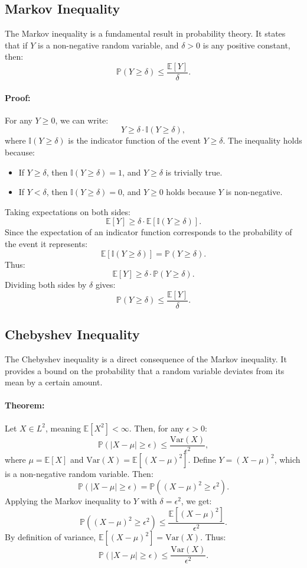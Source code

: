 \subsection{Markov Inequality}
The Markov inequality is a fundamental result in probability theory. It states that if \( Y \) is a non-negative random variable, and \( \delta > 0 \) is any positive constant, then:
\[
\mathbb{P}(Y \geq \delta) \leq \frac{\mathbb{E}[Y]}{\delta}.
\]

\paragraph{Proof:}  
For any \( Y \geq 0 \), we can write:
\[
Y \geq \delta \cdot \mathbb{I}(Y \geq \delta),
\]
where \( \mathbb{I}(Y \geq \delta) \) is the indicator function of the event \( Y \geq \delta \). The inequality holds because:
\begin{itemize}
    \item If \( Y \geq \delta \), then \( \mathbb{I}(Y \geq \delta) = 1 \), and \( Y \geq \delta \) is trivially true.
    \item If \( Y < \delta \), then \( \mathbb{I}(Y \geq \delta) = 0 \), and \( Y \geq 0 \) holds because \( Y \) is non-negative.
\end{itemize}
Taking expectations on both sides:
\[
\mathbb{E}[Y] \geq \delta \cdot \mathbb{E}[\mathbb{I}(Y \geq \delta)].
\]
Since the expectation of an indicator function corresponds to the probability of the event it represents:
\[
\mathbb{E}[\mathbb{I}(Y \geq \delta)] = \mathbb{P}(Y \geq \delta).
\]
Thus:
\[
\mathbb{E}[Y] \geq \delta \cdot \mathbb{P}(Y \geq \delta).
\]
Dividing both sides by \( \delta \) gives:
\[
\mathbb{P}(Y \geq \delta) \leq \frac{\mathbb{E}[Y]}{\delta}.
\]

\subsection{Chebyshev Inequality}
The Chebyshev inequality is a direct consequence of the Markov inequality. It provides a bound on the probability that a random variable deviates from its mean by a certain amount.

\paragraph{Theorem:}
Let \( X \in L^2 \), meaning \( \mathbb{E}[X^2] < \infty \). Then, for any \( \epsilon > 0 \):
\[
\mathbb{P}(|X - \mu| \geq \epsilon) \leq \frac{\mathrm{Var}(X)}{\epsilon^2},
\]
where \( \mu = \mathbb{E}[X] \) and \( \mathrm{Var}(X) = \mathbb{E}[(X - \mu)^2] \). \newline
Define \( Y = (X - \mu)^2 \), which is a non-negative random variable. Then:
\[
\mathbb{P}(|X - \mu| \geq \epsilon) = \mathbb{P}((X - \mu)^2 \geq \epsilon^2).
\]
Applying the Markov inequality to \( Y \) with \( \delta = \epsilon^2 \), we get:
\[
\mathbb{P}((X - \mu)^2 \geq \epsilon^2) \leq \frac{\mathbb{E}[(X - \mu)^2]}{\epsilon^2}.
\]
By definition of variance, \( \mathbb{E}[(X - \mu)^2] = \mathrm{Var}(X) \). Thus:
\[
\mathbb{P}(|X - \mu| \geq \epsilon) \leq \frac{\mathrm{Var}(X)}{\epsilon^2}.
\]

